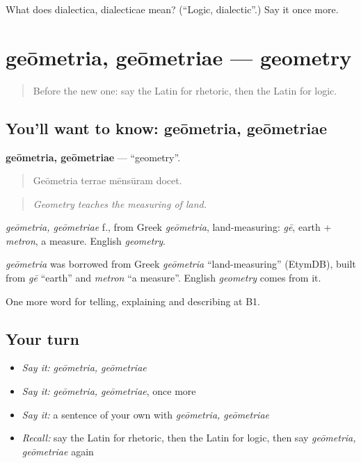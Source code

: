 \begin{tcolorbox}[breakable,colback=teal!4,colframe=teal!35!black,title={Before you move on}]
What does dialectica, dialecticae mean? (\textquotedblleft{}Logic, dialectic\textquotedblright{}.) Say it once more.
\end{tcolorbox}
\section[geōmetria, geōmetriae]{geōmetria, geōmetriae — geometry}

\label{lesson:LA-C404-geometria}



\begin{quote}
Before the new one: say the Latin for rhetoric, then the Latin for logic.
\end{quote}

\subsection*{You'll want to know: geōmetria, geōmetriae}
\textbf{geōmetria, geōmetriae} — \textquotedblleft{}geometry\textquotedblright{}.

\begin{quote}
Geōmetria terrae mēnsūram docet.
\end{quote}

\begin{quote}
\emph{Geometry teaches the measuring of land.}
\end{quote}

\emph{geōmetria, geōmetriae} f., from Greek \emph{geōmetria}, land-measuring: \emph{gē}, earth + \emph{metron}, a measure. English \emph{geometry}.

\begin{cousinweb}
\emph{geōmetria} was borrowed from Greek \emph{geōmetria} \textquotedblleft{}land-measuring\textquotedblright{} (EtymDB), built from \emph{gē} \textquotedblleft{}earth\textquotedblright{} and \emph{metron} \textquotedblleft{}a measure\textquotedblright{}. English \emph{geometry} comes from it.
\end{cousinweb}

\begin{grammarlens}[title={What you've built}]
One more word for telling, explaining and describing at B1.
\end{grammarlens}

\subsection*{Your turn}
\begin{itemize}
\raggedright
  \item \emph{Say it:} \emph{geōmetria, geōmetriae}
  \item \emph{Say it:} \emph{geōmetria, geōmetriae}, once more
  \item \emph{Say it:} a sentence of your own with \emph{geōmetria, geōmetriae}
  \item \emph{Recall:} say the Latin for rhetoric, then the Latin for logic, then say \emph{geōmetria, geōmetriae} again
\end{itemize}

